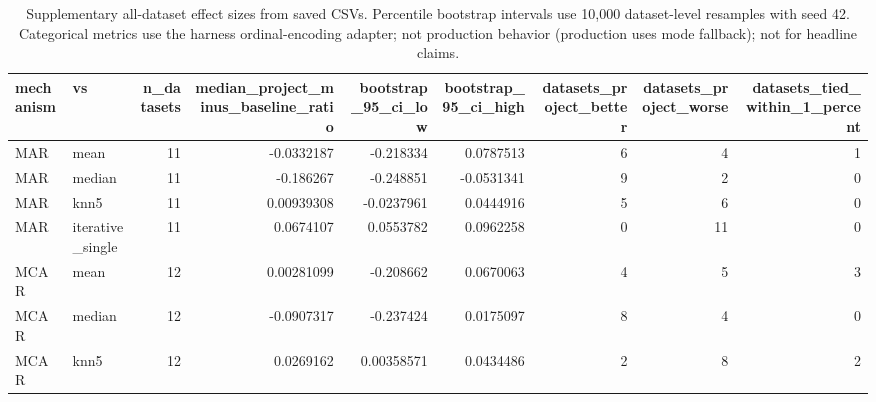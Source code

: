 \begin{table}[ht]
\centering
\caption{Supplementary all-dataset effect sizes from saved CSVs. Percentile bootstrap intervals use 10,000 dataset-level resamples with seed 42. Categorical metrics use the harness ordinal-encoding adapter; not production behavior (production uses mode fallback); not for headline claims.}
\label{tab:protocol_a_effect_sizes_all_datasets_supplementary}
\begin{tabular}{llrrrrrrr}
\hline
 mechanism   & vs               &   n\_datasets &   median\_project\_minus\_baseline\_ratio &   bootstrap\_95\_ci\_low &   bootstrap\_95\_ci\_high &   datasets\_project\_better &   datasets\_project\_worse &   datasets\_tied\_within\_1\_percent \\
\hline
 MAR         & mean             &           11 &                           -0.0332187  &           -0.218334   &            0.0787513   &                         6 &                        4 &                                1 \\
 MAR         & median           &           11 &                           -0.186267   &           -0.248851   &           -0.0531341   &                         9 &                        2 &                                0 \\
 MAR         & knn5             &           11 &                            0.00939308 &           -0.0237961  &            0.0444916   &                         5 &                        6 &                                0 \\
 MAR         & iterative\_single &           11 &                            0.0674107  &            0.0553782  &            0.0962258   &                         0 &                       11 &                                0 \\
 MCAR        & mean             &           12 &                            0.00281099 &           -0.208662   &            0.0670063   &                         4 &                        5 &                                3 \\
 MCAR        & median           &           12 &                           -0.0907317  &           -0.237424   &            0.0175097   &                         8 &                        4 &                                0 \\
 MCAR        & knn5             &           12 &                            0.0269162  &            0.00358571 &            0.0434486   &                         2 &                        8 &                                2 \\

\end{tabular}
\end{table}
